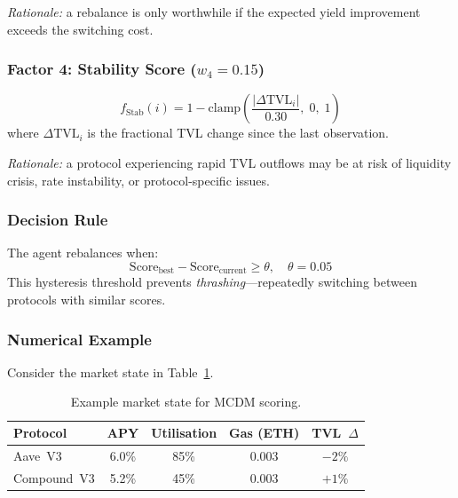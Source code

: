 \documentclass[12pt]{article}
\begin{document}
\emph{Rationale:} a rebalance is only worthwhile if the expected yield improvement exceeds the switching cost.

\subsubsection{Factor 4: Stability Score ($w_4 = 0.15$)}

\begin{equation}
  f_{\text{Stab}}(i) = 1 - \text{clamp}\!\left(\frac{\lvert\Delta\text{TVL}_i\rvert}{0.30},\; 0,\; 1\right)
  \label{eq:f-stab}
\end{equation}
where $\Delta\text{TVL}_i$ is the fractional TVL change since the last observation.

\emph{Rationale:} a protocol experiencing rapid TVL outflows may be at risk of liquidity crisis, rate instability, or protocol-specific issues.

\subsubsection{Decision Rule}

The agent rebalances when:
\begin{equation}
  \text{Score}_{\text{best}} - \text{Score}_{\text{current}} \geq \theta, \quad \theta = 0.05
  \label{eq:threshold}
\end{equation}
This hysteresis threshold prevents \emph{thrashing}---repeatedly switching between protocols with similar scores.

\subsubsection{Numerical Example}

Consider the market state in Table~\ref{tab:example-input}.

\begin{table}[H]
\centering
\caption{Example market state for MCDM scoring.}
\label{tab:example-input}
\small
\begin{tabular}{@{}lcccc@{}}
\toprule
\textbf{Protocol} & \textbf{APY} & \textbf{Utilisation} & \textbf{Gas (ETH)} & \textbf{TVL~$\Delta$} \\
\midrule
Aave~V3     & 6.0\% & 85\% & 0.003 & $-2\%$ \\
Compound~V3 & 5.2\% & 45\% & 0.003 & $+1\%$ \\
\bottomrule
\end{tabular}
\end{table}
\end{document}

